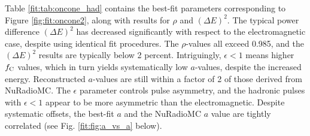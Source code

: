 \documentclass[amsmath,amssymb,aps,prd,10pt,twocolumn]{revtex4}
\begin{document}
Table \ref{fit:tab:oncone_had} contains the best-fit parameters corresponding to Figure \ref{fig:fit:oncone2}, along with results for $\rho$ and $(\Delta E)^2$.  The typical power difference $(\Delta E)^2$ has decreased significantly with respect to the electromagnetic case, despite using identical fit procedures.  The $\rho$-values all exceed 0.985, and the $(\Delta E)^2$ results are typically below 2 percent.  Intriguingly, $\epsilon < 1$ means higher $f_{\rm C}$ values, which in turn yields systematically low $a$-values, despite the increased energy.  Reconstructed $a$-values are still within a factor of 2 of those derived from NuRadioMC.  The $\epsilon$ parameter controls pulse asymmetry, and the hadronic pulses with $\epsilon < 1$ appear to be more asymmetric than the electromagnetic.  Despite systematic offsets, the best-fit $a$ and the NuRadioMC $a$ value are tightly correlated (see Fig. \ref{fit:fig:a_vs_a} below).
\end{document}
